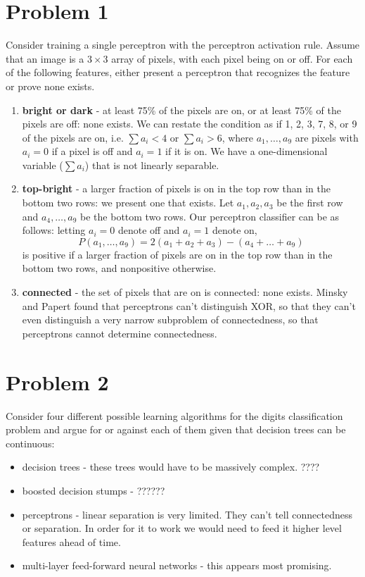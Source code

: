 \documentclass{article}
\begin{document}
\section*{Problem 1}

Consider training a single perceptron with the perceptron activation rule.
Assume that an image is a $3\times 3$ array of pixels, with each pixel 
being on or off. For each of the following features, either present a 
perceptron that recognizes the feature or prove none exists.
\begin{enumerate}
\item \textbf{bright or dark} - at least 75\% of the pixels are on, or 
at least 75\% of the pixels are off: none exists.
We can restate the condition as if 1, 2, 3, 7, 8, or 9 of the pixels are on,
i.e. $\sum a_i<4$ or $\sum a_i>6$, where $a_1,\ldots,a_9$ are pixels with $a_i=0$ if a pixel
is off and $a_i=1$ if it is on. We have a one-dimensional variable ($\sum a_i$)
that is not linearly separable. 

\item \textbf{top-bright} - a larger fraction of pixels is on in the top
row than in the bottom two rows: we present one that exists. 
Let $a_1,a_2,a_3$ be the first row and
$a_4,\ldots,a_9$ be the bottom two rows. Our perceptron classifier can
be as follows: letting $a_i=0$ denote off and $a_i=1$ denote on, 
$$P(a_1,\ldots,a_9)=2(a_1+a_2+a_3)-(a_4+\ldots+a_9)$$
is positive if a larger fraction of pixels are on in the top row than
in the bottom two rows, and nonpositive otherwise. 

\item \textbf{connected} - the set of pixels that are on is connected: 
none exists. Minsky and Papert found that perceptrons can't distinguish
XOR, so that they can't even distinguish a very narrow subproblem of
connectedness, so that perceptrons cannot determine connectedness. 
\end{enumerate}

\section*{Problem 2}
Consider four different possible learning algorithms for the digits
classification problem and argue for or against each of them given that
decision trees can be continuous: 
\begin{itemize}
\item decision trees - 
 these trees would have to be massively complex. ????
\item boosted decision stumps - ??????
\item perceptrons - linear separation is very limited. They can't tell 
connectedness or separation. In order for it to work we would need to
feed it higher level features ahead of time.  

\item multi-layer feed-forward neural networks - this appears most promising. 

\end{itemize}
\end{document}
